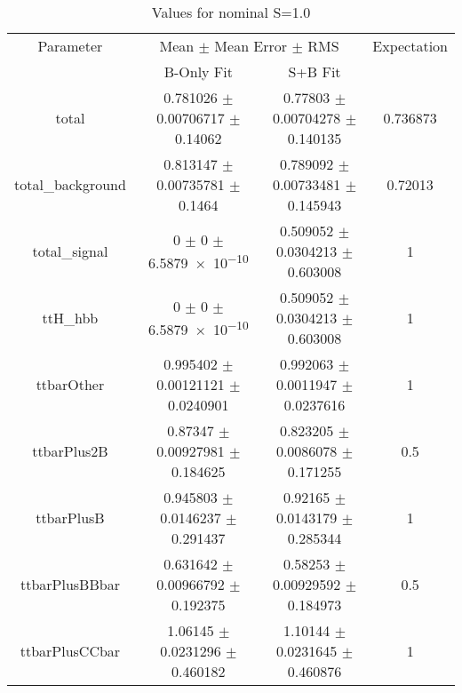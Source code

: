 \begin{table}
\centering
\caption{Values for nominal S=1.0}
\begin{tabular}{cccc}
\toprule
Parameter & \multicolumn{2}{c}{Mean $\pm$ Mean Error $\pm$ RMS} & Expectation\\
 & B-Only Fit & S+B Fit & \\
\midrule
total & \num{0.781026} $\pm$ \num{0.00706717} $\pm$ \num{0.14062} & \num{0.77803} $\pm$ \num{0.00704278} $\pm$ \num{0.140135} & \num{0.736873}\\
total\_background & \num{0.813147} $\pm$ \num{0.00735781} $\pm$ \num{0.1464} & \num{0.789092} $\pm$ \num{0.00733481} $\pm$ \num{0.145943} & \num{0.72013}\\
total\_signal & \num{0} $\pm$ \num{0} $\pm$ \num{6.5879e-10} & \num{0.509052} $\pm$ \num{0.0304213} $\pm$ \num{0.603008} & \num{1}\\
ttH\_hbb & \num{0} $\pm$ \num{0} $\pm$ \num{6.5879e-10} & \num{0.509052} $\pm$ \num{0.0304213} $\pm$ \num{0.603008} & \num{1}\\
ttbarOther & \num{0.995402} $\pm$ \num{0.00121121} $\pm$ \num{0.0240901} & \num{0.992063} $\pm$ \num{0.0011947} $\pm$ \num{0.0237616} & \num{1}\\
ttbarPlus2B & \num{0.87347} $\pm$ \num{0.00927981} $\pm$ \num{0.184625} & \num{0.823205} $\pm$ \num{0.0086078} $\pm$ \num{0.171255} & \num{0.5}\\
ttbarPlusB & \num{0.945803} $\pm$ \num{0.0146237} $\pm$ \num{0.291437} & \num{0.92165} $\pm$ \num{0.0143179} $\pm$ \num{0.285344} & \num{1}\\
ttbarPlusBBbar & \num{0.631642} $\pm$ \num{0.00966792} $\pm$ \num{0.192375} & \num{0.58253} $\pm$ \num{0.00929592} $\pm$ \num{0.184973} & \num{0.5}\\
ttbarPlusCCbar & \num{1.06145} $\pm$ \num{0.0231296} $\pm$ \num{0.460182} & \num{1.10144} $\pm$ \num{0.0231645} $\pm$ \num{0.460876} & \num{1}\\
\bottomrule
\end{tabular}
\end{table}